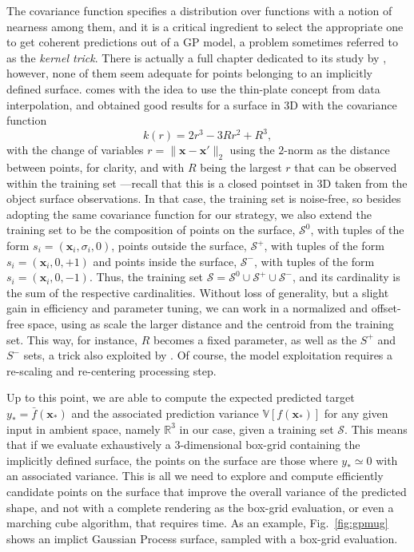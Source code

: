 The covariance function specifies a distribution over functions with a notion of nearness among them, and it is a critical ingredient to select the appropriate one to get coherent predictions out of a GP model, a problem sometimes referred to as the \emph{kernel trick}. There is actually a full chapter dedicated to its study by \citet[see Ch. 4]{Rasmussen2006Gaussian}, however, none of them seem adequate for points belonging to an implicitly defined surface. \citet{Williams2007Gaussian} comes with the idea to use the thin-plate concept from data interpolation, and obtained good results for a surface in 3D with the covariance function
\begin{equation}
k(r) = 2r^{3} - 3Rr^2 + R^3,
\end{equation}
with the change of variables $r = \| \mathbf{x} - \mathbf{x}' \|_2$ using the $2$-norm as the distance between points, for clarity, and with $R$ being the largest $r$ that can be observed within the training set ---recall that this is a closed pointset in 3D taken from the object surface observations. In that case, the training set is noise-free, so besides adopting the same covariance function for our strategy, we also extend the training set to be the composition of points on the surface, $\mathcal{S}^0$, with tuples of the form $s_i = (\mathbf{x}_i, \sigma_i, 0)$, points outside the surface, $\mathcal{S}^+$, with tuples of the form $s_i = (\mathbf{x}_i, 0, +1)$ and points inside the surface, $\mathcal{S}^-$, with tuples of the form $s_i = (\mathbf{x}_i, 0, -1)$. Thus, the training set $\mathcal{S} = \mathcal{S}^0 \cup \mathcal{S}^+ \cup \mathcal{S}^-$, and its cardinality is the sum of the respective cardinalities. Without loss of generality, but a slight gain in efficiency and parameter tuning, we can work in a normalized and offset-free space, using as scale the larger distance and the centroid from the training set. This way, for instance, $R$ becomes a fixed parameter, as well as the $S^+$ and $S^-$ sets, a trick also exploited by \citet{Li2016Dexterous}. Of course, the model exploitation requires a re-scaling and re-centering processing step.

Up to this point, we are able to compute the expected predicted target $y_* = \bar{f}(\mathbf{x}_*)$ and the associated prediction variance $\mathbb{V}[f(\mathbf{x}_*)]$ for any given input in ambient space, namely $\mathbb{R}^3$ in our case, given a training set $\mathcal{S}$. This means that if we evaluate exhaustively a $3$-dimensional box-grid containing the implicitly defined surface, the points on the surface are those where $y_* \simeq 0$ with an associated variance. This is all we need to explore and compute efficiently candidate points on the surface that improve the overall variance of the predicted shape, and not with a complete rendering as the box-grid evaluation, or even a marching cube algorithm, that requires time.
As an example, Fig.~\ref{fig:gpmug} shows an implict Gaussian Process surface, sampled with a box-grid evaluation.

